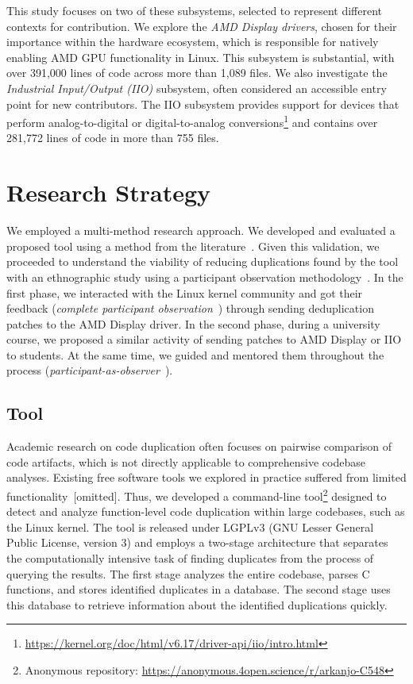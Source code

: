 \documentclass[sigconf]{acmart}
\begin{document}
This study focuses on two of these subsystems, selected to represent different contexts for contribution. We explore the \textit{AMD Display drivers}, chosen for their importance within the hardware ecosystem, which is responsible for natively enabling AMD GPU functionality in Linux. This subsystem is substantial, with over 391,000 lines of code across more than 1,089 files. We also investigate the \textit{Industrial Input/Output (IIO)} subsystem, often considered an accessible entry point for new contributors. The IIO subsystem provides support for devices that perform analog-to-digital or digital-to-analog conversions\footnote{\href{https://kernel.org/doc/html/v6.17/driver-api/iio/intro.html}{https://kernel.org/doc/html/v6.17/driver-api/iio/intro.html}} and contains over 281,772 lines of code in more than 755 files.

\section{Research Strategy}

We employed a multi-method research approach. We developed and evaluated a proposed tool using a method from the literature~\cite{bigclonebench}. Given this validation, we proceeded to understand the viability of reducing duplications found by the tool with an ethnographic study using a participant observation methodology~\cite{gold1958roles}. In the first phase, we interacted with the Linux kernel community and got their feedback (\textit{complete participant observation}~\cite{gold1958roles}) through sending deduplication patches to the AMD Display driver. In the second phase, during a university course, we proposed a similar activity of sending patches to AMD Display or IIO to students. At the same time, we guided and mentored them throughout the process (\textit{participant-as-observer}~\cite{gold1958roles}).

\subsection{Tool}

Academic research on code duplication often focuses on pairwise comparison of code artifacts, which is not directly applicable to comprehensive codebase analyses. Existing free software tools we explored in practice suffered from limited functionality~[omitted]. Thus, we developed a command-line tool\footnote{Anonymous repository:  \url{https://anonymous.4open.science/r/arkanjo-C548}} designed to detect and analyze function-level code duplication within large codebases, such as the Linux kernel. The tool is released under LGPLv3 (GNU Lesser General Public License, version 3) and employs a two-stage architecture that separates the computationally intensive task of finding duplicates from the process of querying the results. The first stage analyzes the entire codebase, parses C functions, and stores identified duplicates in a database. The second stage uses this database to retrieve information about the identified duplications quickly.
\end{document}
